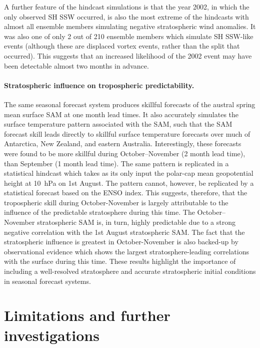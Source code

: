 A further feature of the hindcast simulations is that the year 2002, in which
the only observed SH SSW occurred, is also the most extreme of the hindcasts
with almost all ensemble members simulating negative stratospheric wind
anomalies. It was also one of only 2 out of 210 ensemble members which simulate
SH SSW-like events (although these are displaced vortex events, rather than the
split that occurred). This suggests that an increased likelihood of the 2002
event may have been detectable almost two months in advance.

\paragraph{Stratospheric influence on tropospheric predictability.} The same
seasonal forecast system produces skillful forecasts of the austral spring mean
surface SAM at one month lead times. It also accurately simulates the surface
temperature pattern associated with the SAM, such that the SAM forecast skill
leads directly to skillful surface temperature forecasts over much of Antarctica,
New Zealand, and eastern Australia. Interestingly, these forecasts were found to
be more skillful during October--November (2 month lead time), than September (1
month lead time). The same pattern is replicated in a statistical hindcast which
takes as its only input the polar-cap mean geopotential height at 10~hPa on 1st
August. The pattern cannot, however, be replicated by a statistical forecast
based on the ENSO index. This suggests, therefore, that the tropospheric skill
during October-November is largely attributable to the influence of the
predictable stratosphere during this time. The October--November stratospheric
SAM is, in turn, highly predictable due to a strong negative correlation with
the 1st August stratospheric SAM. The fact that the stratospheric influence is
greatest in October-November is also backed-up by observational evidence which
shows the largest stratosphere-leading correlations with the surface during this
time. These results highlight the importance of including a well-resolved
stratosphere and accurate stratospheric initial conditions in seasonal forecast
systems.


\section{Limitations and further investigations}

